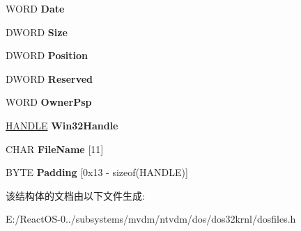 \begin{DoxyCompactItemize}
W\+O\+RD {\bfseries Date}
\item 
\mbox{\label{struct___d_o_s___f_i_l_e___d_e_s_c_r_i_p_t_o_r_ab3d25db35b326bda6ef7ea1623325b47}} 
D\+W\+O\+RD {\bfseries Size}
\item 
\mbox{\label{struct___d_o_s___f_i_l_e___d_e_s_c_r_i_p_t_o_r_ad914c664ab36e23dde8e5977881b5a05}} 
D\+W\+O\+RD {\bfseries Position}
\item 
\mbox{\label{struct___d_o_s___f_i_l_e___d_e_s_c_r_i_p_t_o_r_a315745d61b75686096acb25ae7d03db1}} 
D\+W\+O\+RD {\bfseries Reserved}
\item 
\mbox{\label{struct___d_o_s___f_i_l_e___d_e_s_c_r_i_p_t_o_r_a18caf8cc456de709b114da84cfb7ffbf}} 
W\+O\+RD {\bfseries Owner\+Psp}
\item 
\mbox{\label{struct___d_o_s___f_i_l_e___d_e_s_c_r_i_p_t_o_r_a15a9aaf787cb6c42437cdb7f3c8fb110}} 
\hyperlink{interfacevoid}{H\+A\+N\+D\+LE} {\bfseries Win32\+Handle}
\item 
\mbox{\label{struct___d_o_s___f_i_l_e___d_e_s_c_r_i_p_t_o_r_aaa2a8636a32533998cea7d35d0ef8207}} 
C\+H\+AR {\bfseries File\+Name} \mbox{[}11\mbox{]}
\item 
\mbox{\label{struct___d_o_s___f_i_l_e___d_e_s_c_r_i_p_t_o_r_af9475b7ffe4ae0a7361440cd07d6e933}} 
B\+Y\+TE {\bfseries Padding} \mbox{[}0x13 -\/ sizeof(\+H\+A\+N\+D\+L\+E)\mbox{]}
\end{DoxyCompactItemize}


该结构体的文档由以下文件生成\+:\begin{DoxyCompactItemize}
\item 
E\+:/\+React\+O\+S-\/0../subsystems/mvdm/ntvdm/dos/dos32krnl/dosfiles.\+h\end{DoxyCompactItemize}
